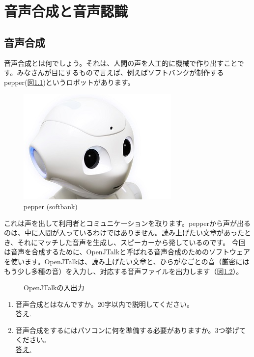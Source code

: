 \chapter{音声合成と音声認識}
\section{音声合成}
音声合成とは何でしょう。それは、人間の声を人工的に機械で作り出すことです。みなさんが目にするもので言えば、例えばソフトバンクが制作するpepper(図\ref{pepper})というロボットがあります。

\begin{figure}[H]
\begin{center}
    \includegraphics[width=0.5\linewidth]{images/chap06/text06-img001.jpg}
    \caption{pepper (softbank)}
    \label{pepper}
\end{center}
\end{figure}

これは声を出して利用者とコミュニケーションを取ります。pepperから声が出るのは、中に人間が入っているわけではありません。読み上げたい文章があったとき、それにマッチした音声を生成し、スピーカーから発しているのです。
今回は音声を合成するために、OpenJTalkと呼ばれる音声合成のためのソフトウェアを使います。OpenJTalkは、読み上げたい文章と、ひらがなごとの音（厳密にはもう少し多種の音）を入力し、対応する音声ファイルを出力します（図\ref{OpenJTalkの入出力}）。

\begin{figure}[H]
\begin{center}
    
    \caption{OpenJTalkの入出力}
    \label{OpenJTalkの入出力}
\end{center}
\end{figure}

\begin{tcolorbox}[title=\useOmetoi]
\begin{enumerate}
\item 音声合成とはなんですか。20字以内で説明してください。\\
\underline{答え.\hspace{0.8\linewidth}}
\item 音声合成をするにはパソコンに何を準備する必要がありますか。3つ挙げてください。\\
\underline{答え.\hspace{0.8\linewidth}}
\end{enumerate}
\end{tcolorbox}
